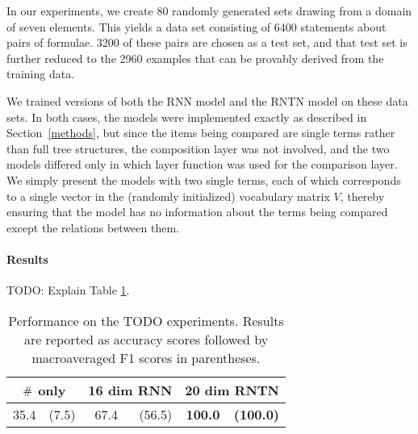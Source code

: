 
In our experiments, we create 80 randomly generated sets drawing from
a domain of seven elements. This yields a data set consisting of
6400 statements about pairs of formulae. 3200 of these pairs are
chosen as a test set, and that test set is further reduced to the 2960
examples that can be provably derived from the training data.

We trained versions of both the RNN model and the RNTN model on these
data sets. In both cases, the models were implemented exactly as
described in Section~\ref{methods}, but since the items being compared
are single terms rather than full tree structures, the composition
layer was not involved, and the two models differed only in which
layer function was used for the comparison layer. We simply present
the models with two single terms, each of which corresponds to a
single vector in the (randomly initialized) vocabulary matrix $V$,
thereby ensuring that the model has no information about the terms
being compared except the relations between them.

\paragraph{Results} 
TODO: Explain Table \ref{joinresultstable}.

\begin{table}[tp]
  \centering
  \setlength{\tabcolsep}{10pt}
  \begin{tabular}{ r@{ \ }r r@{ \ }r r@{ \ }r }
    \toprule
    \multicolumn{2}{c}{$\mathbin{\#}$ only} & \multicolumn{2}{c}{16 dim RNN}  & \multicolumn{2}{c}{20 dim RNTN}\\
    \midrule
    35.4 &(7.5) &	67.4&(56.5)& \textbf{100.0} & \textbf{(100.0)}\\
    \bottomrule
  \end{tabular}
  \caption{Performance on the TODO experiments. Results are reported as accuracy scores followed by macroaveraged F1 scores in parentheses.}
  \label{joinresultstable}
\end{table} %



